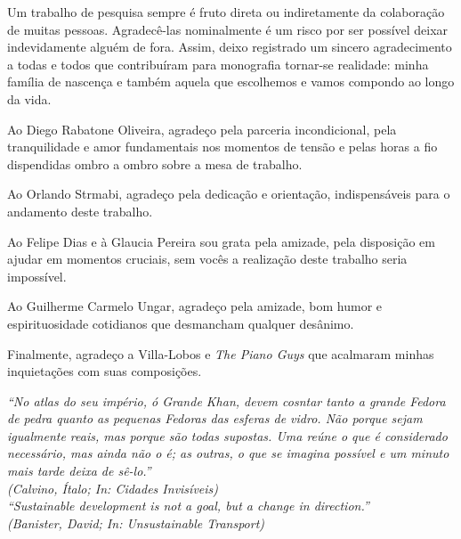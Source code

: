 \documentclass[
  12pt,        %
  openright,      %
  twoside,      %
  a4paper,      %
  english,      %
  brazil        %
]{abntex2}
\begin{document}
\begin{agradecimentos} 
Um trabalho de pesquisa sempre é fruto direta ou indiretamente da colaboração de muitas pessoas.
Agradecê-las nominalmente é um risco por ser possível deixar indevidamente alguém de fora.
Assim, deixo registrado um sincero agradecimento a todas e todos que contribuíram para monografia tornar-se realidade: minha família de nascença e também aquela que escolhemos e vamos compondo ao longo da vida.

Ao Diego Rabatone Oliveira, agradeço pela parceria incondicional, pela tranquilidade e amor fundamentais nos momentos de tensão e pelas horas a fio dispendidas ombro a ombro sobre a mesa de trabalho. 

Ao Orlando Strmabi, agradeço pela dedicação e orientação, indispensáveis para o andamento deste trabalho.

Ao Felipe Dias e à Glaucia Pereira sou grata pela amizade, pela disposição em ajudar em momentos cruciais, sem vocês a realização deste trabalho seria impossível.

Ao Guilherme Carmelo Ungar, agradeço pela amizade, bom humor e espirituosidade cotidianos que desmancham qualquer desânimo.

Finalmente, agradeço a Villa-Lobos e \emph{The Piano Guys} que acalmaram minhas inquietações com suas composições.

\end{agradecimentos}

\begin{epigrafe}
    \vspace*{\fill}
  \begin{flushright}  
        \textit{``No atlas do seu império, ó Grande Khan, devem cosntar tanto a grande Fedora de pedra quanto as pequenas Fedoras das esferas de vidro. Não porque sejam igualmente reais, mas porque são todas supostas. Uma reúne o que é considerado necessário, mas ainda não o é; as outras, o que se imagina possível e um minuto mais tarde deixa de sê-lo.''\\
    (Calvino, Ítalo; In: Cidades Invisíveis)}\\%
        \textit{``Sustainable development is not a goal, but a change in direction.''\\
    (Banister, David; In: Unsustainable Transport)}\\
    
  \end{flushright}
\end{epigrafe}
\end{document}
